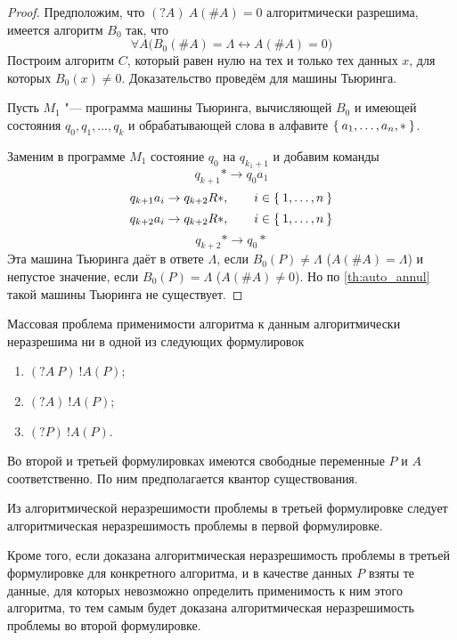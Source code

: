 \begin{proof}
	Предположим, что $ (?A)~A(\#A) = 0 $ алгоритмически разрешима, \ie имеется алгоритм $ B_0 $ так, что
	$$ \forall A \bigl( B_0(\#A) = \Lambda \leftrightarrow A(\#A) = 0 \bigr) $$
	Построим алгоритм $ C $, который равен нулю на тех и только тех данных $ x $, для которых $ B_0(x) \ne 0 $.
	Доказательство проведём для машины Тьюринга.

	Пусть $ M_1 $ "--- программа машины Тьюринга, вычисляющей $ B_0 $ и имеющей состояния $ q_0, q_1, \dots, q_k $ и обрабатывающей слова в алфавите $ \Set{a_1, \dots, a_n, *} $.

	Заменим в программе $ M_1 $ состояние $ q_0 $ на $ q_{k_1 + 1} $ и добавим команды
	$$ q_{k + 1}* \to q_0 a_1 $$
	$$ q_{k + 1} a_i \to q_{k + 2} R *, \qquad i \in \Set{1, \dots, n} $$
	$$ q_{k + 2} a_i \to q_{k + 2} R *, \qquad i \in \Set{1, \dots, n} $$
	$$ q_{k + 2} * \to q_0 * $$
	Эта машина Тьюринга даёт в ответе $ \Lambda $, если $ B_0(P) \ne \Lambda $ (\ie $ A(\#A) = \Lambda $) и непустое значение, если $ B_0(P) = \Lambda $ (\ie $ A(\#A) \ne 0 $).
	Но по \autoref{th:auto_annul} такой машины Тьюринга не существует.
\end{proof}

\begin{theorem}
	Массовая проблема применимости алгоритма к данным алгоритмически неразрешима ни в одной из следующих формулировок
	\begin{enumerate}
		\item $ (?A~P)~!A(P) $;
		\item $ (?A)~!A(P) $;
		\item $ (?P)~!A(P) $.
	\end{enumerate}
\end{theorem}

\begin{remark}
	Во второй и третьей формулировках имеются свободные переменные $ P $ и $ A $ соответственно.
	По ним предполагается квантор существования.

	Из алгоритмической неразрешимости проблемы в третьей формулировке следует алгоритмическая неразрешимость проблемы в первой формулировке.

	Кроме того, если доказана алгоритмическая неразрешимость проблемы в третьей формулировке для конкретного алгоритма, и в качестве данных $ P $ взяты те данные, для которых невозможно определить применимость к ним этого алгоритма, то тем самым будет доказана алгоритмическая неразрешимость проблемы во второй формулировке.
\end{remark}

